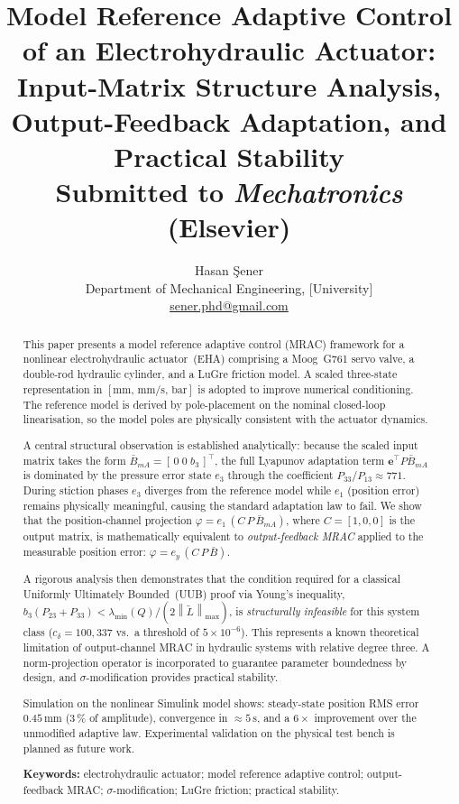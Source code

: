 \documentclass[12pt,a4paper]{article}
\title{\textbf{Model Reference Adaptive Control of an Electrohydraulic
Actuator: Input-Matrix Structure Analysis, Output-Feedback
Adaptation, and Practical Stability}\\[6pt]
\large\normalfont Submitted to \textit{Mechatronics} (Elsevier)}
\author{Hasan \c{S}ener\\
\small Department of Mechanical Engineering, [University]\\
\small \href{mailto:sener.phd@gmail.com}{sener.phd@gmail.com}}
\date{}
\theoremstyle{plain}
\theoremstyle{definition}
\theoremstyle{remark}
\newcommand{\norm}[1]{\left\|#1\right\|}
\newcommand{\bB}{\bar{B}}       %
\newcommand{\eph}{\varphi}      %
\newcommand{\e}{\mathbf{e}}     %
\begin{document}
\maketitle
\thispagestyle{fancy}

\begin{abstract}
This paper presents a model reference adaptive control (MRAC)
framework for a nonlinear electrohydraulic actuator~(EHA) comprising
a Moog~G761 servo valve, a double-rod hydraulic cylinder, and a
LuGre friction model.  A scaled three-state representation in
$[\mathrm{mm},\,\mathrm{mm/s},\,\mathrm{bar}]$ is adopted to improve
numerical conditioning.  The reference model is derived by
pole-placement on the nominal closed-loop linearisation, so the model
poles are physically consistent with the actuator dynamics.

A central structural observation is established analytically: because
the scaled input matrix takes the form
$\bB_{mA}=[\,0\;0\;b_3\,]^\top$, the full Lyapunov adaptation term
$\e^\top P\bB_{mA}$ is dominated by the pressure error state $e_3$
through the coefficient $P_{33}/P_{13}\approx 771$.  During stiction
phases $e_3$ diverges from the reference model while $e_1$ (position
error) remains physically meaningful, causing the standard adaptation
law to fail.  We show that the position-channel projection
$\eph = e_1\,(C\,P\,\bB_{mA})$, where $C=[1,0,0]$ is the output
matrix, is mathematically equivalent to \emph{output-feedback MRAC}
applied to the measurable position error: $\eph = e_y\,(C\,P\,\bB)$.

A rigorous analysis then demonstrates that the condition required for
a classical Uniformly Ultimately Bounded~(UUB) proof via Young's
inequality,
$b_3(P_{23}+P_{33}) < \lambda_{\min}(Q)/(2\norm{\tilde{L}}_{\max})$,
is \emph{structurally infeasible} for this system class
($c_\delta = 100{,}337$ vs.\ a threshold of $5\times 10^{-6}$).  This
represents a known theoretical limitation of output-channel
MRAC in hydraulic systems with relative degree three.  A
norm-projection operator is incorporated to guarantee parameter
boundedness by design, and $\sigma$-modification provides practical
stability.

Simulation on the nonlinear Simulink model shows: steady-state
position RMS error $0.45\,\mathrm{mm}$ ($3\,\%$ of amplitude),
convergence in $\approx5\,\mathrm{s}$, and a $6\times$ improvement
over the unmodified adaptive law.  Experimental validation on the
physical test bench is planned as future work.

\medskip\noindent
\textbf{Keywords:} electrohydraulic actuator; model reference adaptive
control; output-feedback MRAC; $\sigma$-modification; LuGre friction;
practical stability.
\end{abstract}
\end{document}
